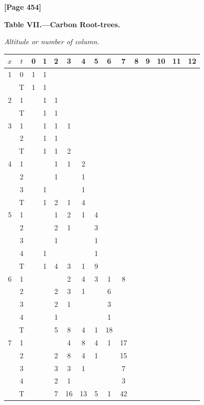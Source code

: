 \documentclass[11pt,a4paper]{article}
\begin{document}
\newpage
\textbf{[Page 454]}

\begin{center}
\textbf{Table VII.---Carbon Root-trees.}
\end{center}

\begin{small}
\textit{Altitude or number of column.}
\begin{center}
\begin{tabular}{|c|c|ccccccccccccc|}
\hline
$x$ & $t$ & 0 & 1 & 2 & 3 & 4 & 5 & 6 & 7 & 8 & 9 & 10 & 11 & 12 \\
\hline
1 & 0 & 1 & 1 & & & & & & & & & & & \\
  & T & 1 & 1 & & & & & & & & & & & \\
\hline
2 & 1 & & 1 & 1 & & & & & & & & & & \\
  & T & & 1 & 1 & & & & & & & & & & \\
\hline
3 & 1 & & 1 & 1 & 1 & & & & & & & & & \\
  & 2 & & 1 & 1 & & & & & & & & & & \\
  & T & & 1 & 1 & 2 & & & & & & & & & \\
\hline
4 & 1 & & & 1 & 1 & 2 & & & & & & & & \\
  & 2 & & & 1 & & 1 & & & & & & & & \\
  & 3 & & 1 & & & 1 & & & & & & & & \\
  & T & & 1 & 2 & 1 & 4 & & & & & & & & \\
\hline
5 & 1 & & & 1 & 2 & 1 & 4 & & & & & & & \\
  & 2 & & & 2 & 1 & & 3 & & & & & & & \\
  & 3 & & & 1 & & & 1 & & & & & & & \\
  & 4 & & 1 & & & & 1 & & & & & & & \\
  & T & & 1 & 4 & 3 & 1 & 9 & & & & & & & \\
\hline
6 & 1 & & & & 2 & 4 & 3 & 1 & 8 & & & & & \\
  & 2 & & & 2 & 3 & 1 & & 6 & & & & & & \\
  & 3 & & & 2 & 1 & & & 3 & & & & & & \\
  & 4 & & & 1 & & & & 1 & & & & & & \\
  & T & & & 5 & 8 & 4 & 1 & 18 & & & & & & \\
\hline
7 & 1 & & & & 4 & 8 & 4 & 1 & 17 & & & & & \\
  & 2 & & & 2 & 8 & 4 & 1 & & 15 & & & & & \\
  & 3 & & & 3 & 3 & 1 & & & 7 & & & & & \\
  & 4 & & & 2 & 1 & & & & 3 & & & & & \\
  & T & & & 7 & 16 & 13 & 5 & 1 & 42 & & & & & \\
\hline
\end{tabular}
\end{center}
\end{small}
\end{document}
